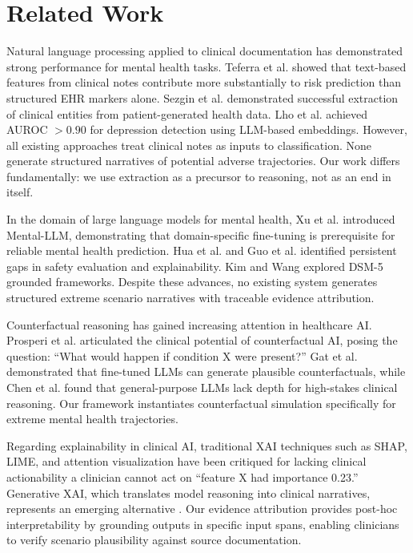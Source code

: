 \documentclass[conference]{IEEEtran}
\begin{document}
\section{Related Work}

Natural language processing applied to clinical documentation has demonstrated strong performance for mental health tasks. Teferra et al. \cite{b2} showed that text-based features from clinical notes contribute more substantially to risk prediction than structured EHR markers alone. Sezgin et al. \cite{b3} demonstrated successful extraction of clinical entities from patient-generated health data. Lho et al. \cite{b16} achieved AUROC $> 0.90$ for depression detection using LLM-based embeddings. However, all existing approaches treat clinical notes as inputs to classification. None generate structured narratives of potential adverse trajectories. Our work differs fundamentally: we use extraction as a precursor to reasoning, not as an end in itself.

In the domain of large language models for mental health, Xu et al. \cite{b4} introduced Mental-LLM, demonstrating that domain-specific fine-tuning is prerequisite for reliable mental health prediction. Hua et al. \cite{b6} and Guo et al. \cite{b5} identified persistent gaps in safety evaluation and explainability. Kim and Wang \cite{b17} explored DSM-5 grounded frameworks. Despite these advances, no existing system generates structured extreme scenario narratives with traceable evidence attribution.

Counterfactual reasoning has gained increasing attention in healthcare AI. Prosperi et al. \cite{b8} articulated the clinical potential of counterfactual AI, posing the question: ``What would happen if condition X were present?'' Gat et al. \cite{b9} demonstrated that fine-tuned LLMs can generate plausible counterfactuals, while Chen et al. \cite{b18} found that general-purpose LLMs lack depth for high-stakes clinical reasoning. Our framework instantiates counterfactual simulation specifically for extreme mental health trajectories.

Regarding explainability in clinical AI, traditional XAI techniques such as SHAP, LIME, and attention visualization have been critiqued for lacking clinical actionability \cite{b10} a clinician cannot act on ``feature X had importance 0.23.'' Generative XAI, which translates model reasoning into clinical narratives, represents an emerging alternative \cite{b11}. Our evidence attribution provides post-hoc interpretability by grounding outputs in specific input spans, enabling clinicians to verify scenario plausibility against source documentation.
\end{document}
